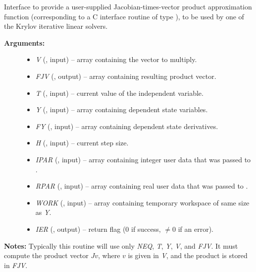 \documentclass[letterpaper,10pt,english]{sphinxmanual}
\begin{document}
\begin{fulllineitems}
\label{f_interface/Usage:f/_/FARKJTIMES}
Interface to provide a user-supplied Jacobian-times-vector product
approximation function (corresponding to a C interface routine of
type {\hyperref[c_interface/User_supplied:ARKSpilsJacTimesVecFn]{}}), to be used by one of the
Krylov iterative linear solvers.
\begin{description}
\item[{\textbf{Arguments:}}] \leavevmode\begin{itemize}
\item {} 
\emph{V}    (, input) -- array containing the vector to multiply.

\item {} 
\emph{FJV}  (, output) -- array containing resulting product vector.

\item {} 
\emph{T}    (, input) -- current value of the independent variable.

\item {} 
\emph{Y}    (, input) -- array containing dependent state variables.

\item {} 
\emph{FY}   (, input) -- array containing dependent state derivatives.

\item {} 
\emph{H}    (, input) -- current step size.

\item {} 
\emph{IPAR} (, input) -- array containing integer user data that was passed to
{\hyperref[f_interface/Usage:f/_/FARKMALLOC]{}}.

\item {} 
\emph{RPAR} (, input) -- array containing real user data that was passed to
{\hyperref[f_interface/Usage:f/_/FARKMALLOC]{}}.

\item {} 
\emph{WORK} (, input) -- array containing temporary workspace of same size as
\emph{Y}.

\item {} 
\emph{IER}  (, output) -- return flag  (0 if success, $\ne 0$ if an error).

\end{itemize}

\end{description}

\textbf{Notes:}
Typically this routine will use only \emph{NEQ}, \emph{T}, \emph{Y}, \emph{V}, and
\emph{FJV}.  It must compute the product vector $Jv$, where
$v$ is given in \emph{V}, and the product is stored in \emph{FJV}.

\end{fulllineitems}
\end{document}

